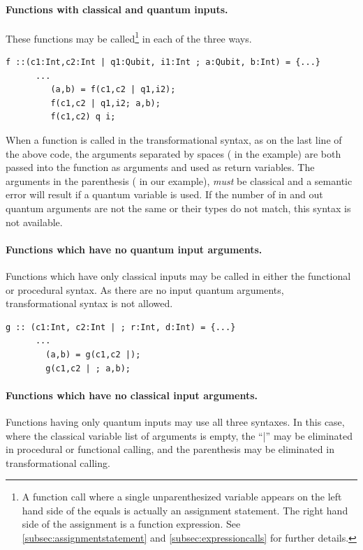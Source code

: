 \paragraph{Functions with classical and quantum inputs.}
These functions  may be called\footnote{A function
call where a  single unparenthesized variable appears on the
left hand side of the equals
 is
 actually an assignment statement. The  right hand side of the assignment 
is a function expression.
See \ref{subsec:assignmentstatement} and \ref{subsec:expressioncalls} for further details.} in each of the
three ways.
\begin{lstlisting}[style=linqpl]
      f ::(c1:Int,c2:Int | q1:Qubit, i1:Int ; a:Qubit, b:Int) = {...}
      ...
         (a,b) = f(c1,c2 | q1,i2);
         f(c1,c2 | q1,i2; a,b);
         f(c1,c2) q i;
\end{lstlisting}

When a function is called in the transformational syntax, as on the last 
line of the above code, the arguments separated by spaces ( in the example) are 
both passed into
the function as arguments and used as return variables. 
The arguments in the parenthesis (  in our example),
\emph{must} be classical and a
 semantic error will result if a quantum variable is used.
If the number of in and out quantum arguments are not the same
or their types
do not match, this syntax is not available.


\paragraph{Functions which have no quantum input arguments.}
Functions which have only classical  inputs 
may be called in either the functional or procedural 
syntax. As there are no input quantum arguments, transformational
syntax is not allowed.

\begin{lstlisting}[style=linqpl]
      g :: (c1:Int, c2:Int | ; r:Int, d:Int) = {...}
      ...
        (a,b) = g(c1,c2 |);
        g(c1,c2 | ; a,b);
\end{lstlisting}


\paragraph{Functions which have no classical input arguments.}
Functions having only quantum  inputs may use
all three syntaxes. In this case, where the classical
variable list of arguments is empty, the ``|'' may 
be eliminated in procedural or functional calling, and the 
parenthesis may be eliminated in transformational calling.

